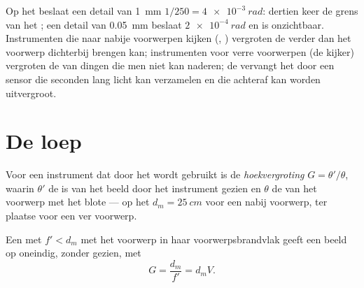 \begin{remark}\label{rem:b1:optical-instruments:purpose}
Op het  beslaat een detail van \qty{1}{mm} $1/250 =
\qty{4e-3}{rad}$: dertien keer de grens van het ; een detail
van \qty{0.05}{mm} beslaat $\qty{2e-4}{rad}$ en is onzichtbaar. Instrumenten
die naar nabije voorwerpen kijken (, ) vergroten de 
verder dan het voorwerp dichterbij brengen kan; instrumenten voor verre
voorwerpen (de kijker) vergroten de  van dingen die men niet kan
naderen; de  vervangt het  door een sensor die seconden lang
licht kan verzamelen en die achteraf kan worden uitvergroot.
\end{remark}

\section{De loep}

\begin{definition}[Hoekvergroting]\label{def:b1:optical-instruments:G}
Voor een instrument dat door het  wordt gebruikt is de \emph{hoekvergroting}
$G = \theta'/\theta$, waarin $\theta'$ de  is van het beeld
door het instrument gezien en $\theta$ de  van het voorwerp met het
blote  --- op het  $d_m = \qty{25}{cm}$ voor een nabij
voorwerp, ter plaatse voor een ver voorwerp.
\end{definition}

\begin{proposition}[De loep]\label{prop:b1:optical-instruments:loupe}
Een  met  $f' < d_m$ met het voorwerp in
haar voorwerpsbrandvlak geeft een beeld op oneindig, zonder 
gezien, met
\[
G = \frac{d_m}{f'} = d_m V .
\]
\end{proposition}

